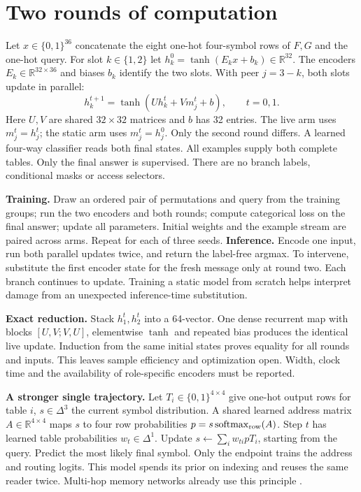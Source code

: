 \documentclass[11pt]{article}
\begin{document}
\section*{Two rounds of computation}
Let $x\in\{0,1\}^{36}$ concatenate the eight one-hot four-symbol rows of $F,G$ and the one-hot query. For slot $k\in\{1,2\}$ let $h^0_k=\tanh(E_kx+b_k)\in\mathbb R^{32}$. The encoders $E_k\in\mathbb R^{32\times36}$ and biases $b_k$ identify the two slots. With peer $j=3-k$, both slots update in parallel:
\[
h^{t+1}_k=\tanh(Uh_k^t+V m_j^t+b),\qquad t=0,1.
\]
Here $U,V$ are shared $32\times32$ matrices and $b$ has 32 entries. The live arm uses $m_j^t=h_j^t$; the static arm uses $m_j^t=h_j^0$. Only the second round differs. A learned four-way classifier reads both final states. All examples supply both complete tables. Only the final answer is supervised. There are no branch labels, conditional masks or access selectors.
\par
\textbf{Training.} Draw an ordered pair of permutations and query from the training groups; run the two encoders and both rounds; compute categorical loss on the final answer; update all parameters. Initial weights and the example stream are paired across arms. Repeat for each of three seeds. \textbf{Inference.} Encode one input, run both parallel updates twice, and return the label-free argmax. To intervene, substitute the first encoder state for the fresh message only at round two. Each branch continues to update. Training a static model from scratch helps interpret damage from an unexpected inference-time substitution.
\par
\textbf{Exact reduction.} Stack $h_1^t,h_2^t$ into a 64-vector. One dense recurrent map with blocks $[U,V;V,U]$, elementwise $\tanh$ and repeated bias produces the identical live update. Induction from the same initial states proves equality for all rounds and inputs. This leaves sample efficiency and optimization open. Width, clock time and the availability of role-specific encoders must be reported.
\par
\textbf{A stronger single trajectory.} Let $T_i\in\{0,1\}^{4\times4}$ give one-hot output rows for table $i$, $s\in\Delta^3$ the current symbol distribution. A shared learned address matrix $A\in\mathbb R^{4\times4}$ maps $s$ to four row probabilities $p=s\,\mathrm{softmax}_{\rm row}(A)$. Step $t$ has learned table probabilities $w_t\in\Delta^1$. Update $s\gets \sum_i w_{ti}pT_i$, starting from the query. Predict the most likely final symbol. Only the endpoint trains the address and routing logits. This model spends its prior on indexing and reuses the same reader twice. Multi-hop memory networks already use this principle \cite{mem}.
\newpage
\end{document}
